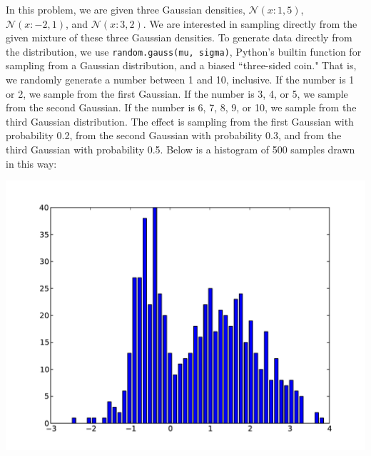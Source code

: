 \documentclass[solution, letterpaper]{cs121}
\begin{document}
\begin{empfile}
\subproblem %
In this problem, we are given three Gaussian densities, $\mathcal{N}(x:1,5)$, $\mathcal{N}(x:-2,1)$, and $\mathcal{N}(x:3,2)$. We are interested in sampling directly from the given mixture of these three Gaussian densities. To generate data directly from the distribution, we use {\tt random.gauss(mu, sigma)}, Python's builtin function for sampling from a Gaussian distribution, and a biased ``three-sided coin." That is, we randomly generate a number between 1 and 10, inclusive. If the number is 1 or 2, we sample from the first Gaussian. If the number is 3, 4, or 5, we sample from the second Gaussian. If the number is 6, 7, 8, 9, or 10, we sample from the third Gaussian distribution. The effect is sampling from the first Gaussian with probability 0.2, from the second Gaussian with probability 0.3, and from the third Gaussian with probability 0.5. Below is a histogram of 500 samples drawn in this way:
\begin{center}
\includegraphics[scale=0.8]{direct-sample-histogram.pdf}
\end{center}


\end{empfile}
\end{document}
